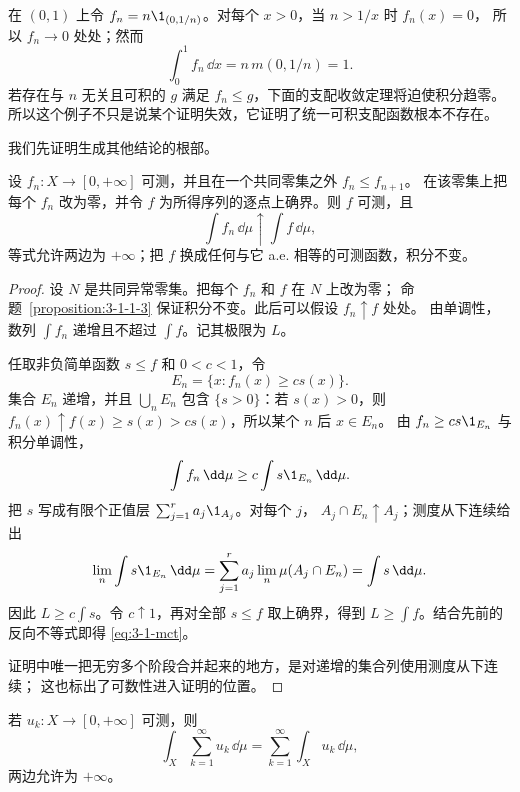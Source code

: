\begin{example}[尖峰压缩]\label{ex:3-1-2-3}
在 $(0,1)$ 上令 $f_n=n\1_{(0,1/n)}$。对每个 $x>0$，当 $n>1/x$ 时 $f_n(x)=0$，
所以 $f_n\to0$ 处处；然而
\[
 \int_0^1 f_n\,\dd x=n\,m(0,1/n)=1.
\]
若存在与 $n$ 无关且可积的 $g$ 满足 $f_n\leq g$，下面的支配收敛定理将迫使积分趋零。
所以这个例子不只是说某个证明失效，它证明了统一可积支配函数根本不存在。
\end{example}

我们先证明生成其他结论的根部。

\begin{theorem}\label{theorem:3-1-2-1}
设 $f_n:X\to[0,+\infty]$ 可测，并且在一个共同零集之外 $f_n\leq f_{n+1}$。
在该零集上把每个 $f_n$ 改为零，并令 $f$ 为所得序列的逐点上确界。则 $f$ 可测，且
\[
 \int f_n\,\dd\mu\uparrow\int f\,\dd\mu,
 \tag{3.1.10}\label{eq:3-1-mct}
\]
等式允许两边为 $+\infty$；把 $f$ 换成任何与它 a.e. 相等的可测函数，积分不变。
\end{theorem}

\begin{proof}
设 $N$ 是共同异常零集。把每个 $f_n$ 和 $f$ 在 $N$ 上改为零；
命题~\ref{proposition:3-1-1-3} 保证积分不变。此后可以假设 $f_n\uparrow f$ 处处。
由单调性，数列 $\int f_n$ 递增且不超过 $\int f$。记其极限为 $L$。

任取非负简单函数 $s\leq f$ 和 $0<c<1$，令
\[
 E_n=\{x:f_n(x)\geq cs(x)\}.
\]
集合 $E_n$ 递增，并且 $\bigcup_nE_n$ 包含 $\{s>0\}$：若 $s(x)>0$，则
$f_n(x)\uparrow f(x)\geq s(x)>cs(x)$，所以某个 $n$ 后 $x\in E_n$。
由 $f_n\geq cs\1_{E_n}$ 与积分单调性，
\[
 \int f_n\,\dd\mu\geq c\int s\1_{E_n}\,\dd\mu.
\]
把 $s$ 写成有限个正值层 $\sum_{j=1}^ra_j\1_{A_j}$。对每个 $j$，
$A_j\cap E_n\uparrow A_j$；测度从下连续给出
\[
 \lim_n\int s\1_{E_n}\,\dd\mu
 =\sum_{j=1}^ra_j\lim_n\mu(A_j\cap E_n)
 =\int s\,\dd\mu.
\]
因此 $L\geq c\int s$。令 $c\uparrow1$，再对全部 $s\leq f$ 取上确界，得到
$L\geq\int f$。结合先前的反向不等式即得 \eqref{eq:3-1-mct}。

证明中唯一把无穷多个阶段合并起来的地方，是对递增的集合列使用测度从下连续；
这也标出了可数性进入证明的位置。
\end{proof}

\begin{corollary}[非负级数可逐项积分]\label{corollary:3-1-2-series}
若 $u_k:X\to[0,+\infty]$ 可测，则
\[
 \int_X\sum_{k=1}^{\infty}u_k\,\dd\mu
 =\sum_{k=1}^{\infty}\int_Xu_k\,\dd\mu,
 \tag{3.1.10a}\label{eq:3-1-series-integral}
\]
两边允许为 $+\infty$。
\end{corollary}


